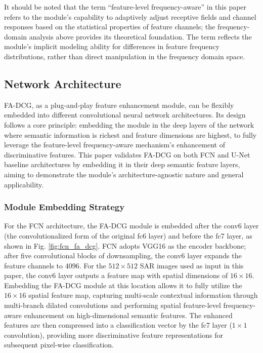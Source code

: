 \documentclass[lettersize,journal]{IEEEtran}
\begin{document}
It should be noted that the term ``feature-level frequency-aware'' in this paper refers to the module's capability to adaptively adjust receptive fields and channel responses based on the statistical properties of feature channels; the frequency-domain analysis above provides its theoretical foundation. The term reflects the module's implicit modeling ability for differences in feature frequency distributions, rather than direct manipulation in the frequency domain space.

\subsection{Network Architecture}

FA-DCG, as a plug-and-play feature enhancement module, can be flexibly embedded into different convolutional neural network architectures. Its design follows a core principle: embedding the module in the deep layers of the network where semantic information is richest and feature dimensions are highest, to fully leverage the feature-level frequency-aware mechanism's enhancement of discriminative features. This paper validates FA-DCG on both FCN and U-Net baseline architectures by embedding it in their deep semantic feature layers, aiming to demonstrate the module's architecture-agnostic nature and general applicability.

\subsubsection{Module Embedding Strategy}

For the FCN architecture, the FA-DCG module is embedded after the conv6 layer (the convolutionalized form of the original fc6 layer) and before the fc7 layer, as shown in Fig. \ref{fig:fcn_fa_dcg}. FCN adopts VGG16 as the encoder backbone; after five convolutional blocks of downsampling, the conv6 layer expands the feature channels to 4096. For the $512\times512$ SAR images used as input in this paper, the conv6 layer outputs a feature map with spatial dimensions of $16\times16$. Embedding the FA-DCG module at this location allows it to fully utilize the $16\times16$ spatial feature map, capturing multi-scale contextual information through multi-branch dilated convolutions and performing spatial feature-level frequency-aware enhancement on high-dimensional semantic features. The enhanced features are then compressed into a classification vector by the fc7 layer ($1\times1$ convolution), providing more discriminative feature representations for subsequent pixel-wise classification.
\end{document}
